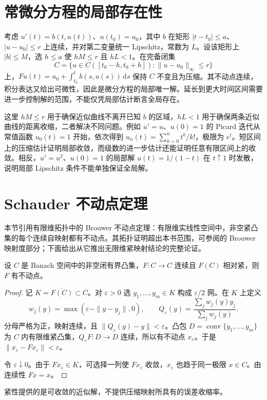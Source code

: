 \documentclass[UTF8,12pt,a4paper,fontset=fandol]{ctexbook}
\begin{document}
\section{常微分方程的局部存在性}
考虑 $u'(t)=b(t,u(t))$、$u(t_0)=u_0$，其中 $b$ 在矩形 $|t-t_0|\leq a$、$|u-u_0|\leq r$ 上连续，并对第二变量统一 Lipschitz，常数为 $L$。设该矩形上 $|b|\leq M$，选 $h\leq a$ 使 $hM\leq r$ 且 $hL<1$。在完备闭集
\[
 C=\{u\in C([t_0-h,t_0+h]):\|u-u_0\|_\infty\leq r\}
\]
上，$Fu(t)=u_0+\int_{t_0}^t b(s,u(s))\,\mathrm ds$ 保持 $C$ 不变且为压缩。其不动点连续，积分表达又给出可微性，因此是微分方程的局部唯一解。延长到更大时间区间需要进一步控制解的范围，不能仅凭局部估计断言全局存在。

这里 $hM\leq r$ 用于确保近似曲线不离开已知 $b$ 的区域，$hL<1$ 用于确保两条近似曲线的距离收缩，二者解决不同问题。例如 $u'=u$、$u(0)=1$ 的 Picard 迭代从常值函数 $u_0(t)=1$ 开始，依次得到 $u_n(t)=\sum_{k=0}^nt^k/k!$，极限为 $e^t$。短区间上的压缩估计证明局部收敛，而级数的进一步估计还能证明任意有限区间上的收敛。相反，$u'=u^2$、$u(0)=1$ 的局部解 $u(t)=1/(1-t)$ 在 $t\uparrow1$ 时发散，说明局部 Lipschitz 条件不能单独保证全局解。

\section{Schauder 不动点定理}
本节引用有限维拓扑中的 Brouwer 不动点定理：有限维实线性空间中，非空紧凸集的每个连续自映射都有不动点。其拓扑证明超出本书范围，可参阅\cite{teschl-fa}的 Brouwer 映射度部分；下面给出从它推出无限维紧映射结论的完整论证。

\begin{theorem}[Schauder]\label{thm:fa-schauder}
设 $C$ 是 Banach 空间中的非空闭有界凸集，$F:C\to C$ 连续且 $F(C)$ 相对紧，则 $F$ 有不动点。
\end{theorem}
\begin{proof}
记 $K=\overline{F(C)}\subset C$。对 $\varepsilon>0$ 选 $y_1,\ldots,y_m\in K$ 构成 $\varepsilon/2$ 网。在 $K$ 上定义
\[
 w_j(y)=\max(\varepsilon-\|y-y_j\|,0),\qquad
 Q_\varepsilon(y)=\frac{\sum_jw_j(y)y_j}{\sum_jw_j(y)}.
\]
分母严格为正，映射连续，且 $\|Q_\varepsilon(y)-y\|<\varepsilon$。凸包 $D=\operatorname{conv}\{y_1,\ldots,y_m\}$ 为 $C$ 内有限维紧凸集，$Q_\varepsilon F:D\to D$ 连续，所以有不动点 $x_\varepsilon$。于是 $\|x_\varepsilon-Fx_\varepsilon\|<\varepsilon$。

令 $\varepsilon\downarrow0$。由于 $Fx_\varepsilon\in K$，可选择一列使 $Fx_\varepsilon$ 收敛，$x_\varepsilon$ 也趋于同一极限 $x\in C$。由连续性 $Fx=x$。
\end{proof}
紧性提供的是可收敛的近似解，不提供压缩映射所具有的误差收缩率。
\end{document}
